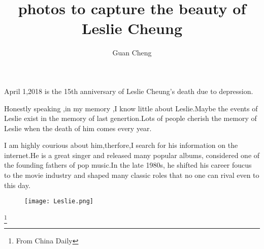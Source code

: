 \documentclass[UTF8]{article}
\author{Guan Cheng}
\title{photos to capture the beauty of Leslie Cheung}
\begin{document}
\maketitle

   April 1,2018 is the 15th anniversary of Leslie Cheung's death due to
   depression.

   Honestly speaking ,in my memory ,I know little about Leslie.Maybe
   the events of Leslie exist in the memory of last genertion.Lots of
   people cherish the memory of Leslie when the death of him comes every
   year.

   I am highly courious about him,therfore,I search for his information
   on the internet.He is a great singer and released many popular albums,
   considered one of the founding fathers of pop music.In the late 1980s,
   he shifted his career foucus to the movie industry and shaped many
   classic roles that no one can rival even to this day.

   \begin{figure}[ht]
     \centering
     \texttt{[image: Leslie.png]}
   \end{figure}

   \footnote{\centering From China Daily}
 
\end{document}
